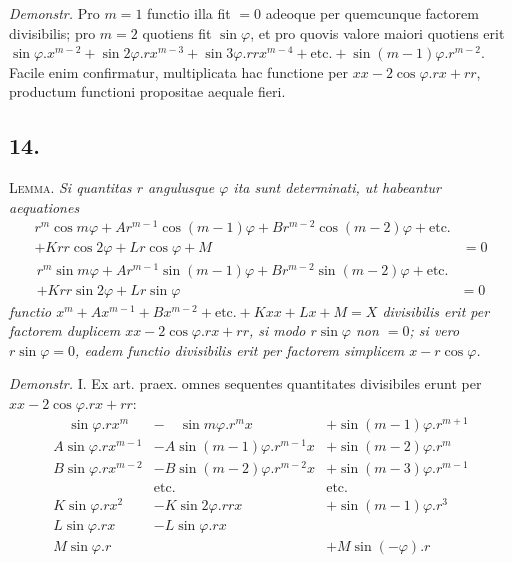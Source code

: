 \documentclass[14pt]{memoir}
\theoremstyle{plain}
\theoremstyle{remark}
\begin{document}
\textit{Demonstr.} Pro \(m = 1\) functio illa fit \(= 0\) adeoque per quemcunque factorem divisibilis; pro \(m=2\) quotiens fit \(\sin \varphi\), et pro quovis valore maiori quotiens erit \( \sin \varphi.x^{m-2} + \sin 2\varphi . rx^{m-3} + \sin 3\varphi . rrx^{m-4} + \text{etc.}+\sin(m-1)\varphi . r^{m-2} \). Facile enim confirmatur, multiplicata hac functione per \(xx-2\cos\varphi.rx + rr\), productum functioni propositae aequale fieri.

\subsection*{14.}

\textsc{Lemma.} \textit{Si quantitas \(r\) angulusque \(\varphi\) ita sunt determinati, ut habeantur aequationes}
\begin{align*} r^m \cos m \varphi + A r^{m-1} \cos(m-1) \varphi + B r^{m-2}\cos(m-2) \varphi + \text{etc.} &\\
+ Krr \cos 2\varphi + Lr \cos \varphi + M &= 0  \tag*{[1]} \end{align*}
\begin{align*} r^m \sin m \varphi + A r^{m-1} \sin(m-1) \varphi + B r^{m-2}\sin(m-2) \varphi + \text{etc.}& \\
+ Krr \sin 2\varphi + Lr \sin \varphi & = 0  \tag*{[2]}\end{align*}
\textit{functio \(x^m+Ax^{m-1} + Bx^{m-2}+\text{etc.}+Kxx + Lx + M = X\) divisibilis erit per factorem duplicem \(xx-2\cos\varphi.rx+rr\), si modo \(r\sin\varphi\) non \(=0\); si vero \(r\sin\varphi = 0\), eadem functio divisibilis erit per factorem simplicem \(x - r \cos\varphi\).}

\textit{Demonstr.} I. Ex art. praex. omnes sequentes quantitates divisibiles erunt per \(xx - 2\cos \varphi . rx + rr\):\[\begin{array}{lll} \hspace{1em} \sin \varphi. rx^m &-\hspace{1em} \sin m \varphi . r^m x &+ \sin (m-1) \varphi . r^{m+1} \\ A\sin \varphi. rx^{m-1} &- A\sin (m-1) \varphi . r^{m-1} x &+ \sin (m-2) \varphi . r^{m} \\ B\sin \varphi. rx^{m-2} &- B \sin (m-2) \varphi . r^{m-2} x &+ \sin (m-3) \varphi . r^{m-1} \\ &\text{etc.} & \text{etc.} \\ K\sin \varphi. rx^2 &- K\sin 2 \varphi . rr x &+ \sin (m-1) \varphi . r^{3} \\ L\sin \varphi. rx &- L \sin  \varphi . r x &  \\ M\sin \varphi. r &  &+ M\sin(-\varphi).r \end{array}\]
\end{document}
